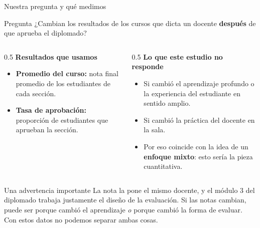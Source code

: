 \documentclass[10pt,aspectratio=169]{beamer}
\begin{document}
\begin{frame}{Nuestra pregunta y qué medimos}
  \begin{block}{Pregunta}
    ¿Cambian los resultados de los cursos que dicta un docente \textbf{después} de que aprueba el diplomado?
  \end{block}
  \begin{columns}[T]
    \begin{column}{0.5\textwidth}
      \textbf{Resultados que usamos}
      \begin{itemize}\small
        \item \textbf{Promedio del curso:} nota final promedio de los estudiantes de cada sección.
        \item \textbf{Tasa de aprobación:} proporción de estudiantes que aprueban la sección.
      \end{itemize}
    \end{column}
    \begin{column}{0.5\textwidth}
      \textbf{Lo que este estudio no responde}
      \begin{itemize}\small
        \item Si cambió el aprendizaje profundo o la experiencia del estudiante en sentido amplio.
        \item Si cambió la práctica del docente en la sala.
        \item Por eso coincide con la idea de un \textbf{enfoque mixto}: esto sería la pieza cuantitativa.
      \end{itemize}
    \end{column}
  \end{columns}
  \vspace{0.3em}
  \begin{alertblock}{Una advertencia importante}
    La nota la pone el mismo docente, y el módulo 3 del diplomado trabaja justamente el diseño de la evaluación. Si las notas cambian, puede ser porque cambió el aprendizaje \emph{o} porque cambió la forma de evaluar. Con estos datos no podemos separar ambas cosas.
  \end{alertblock}
\end{frame}
\end{document}
